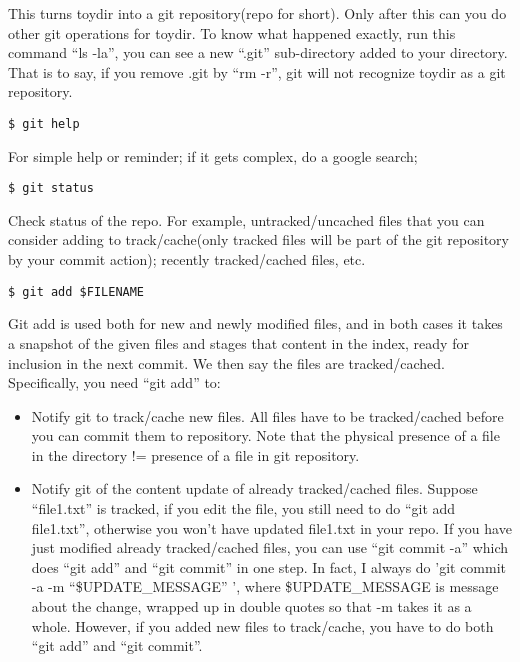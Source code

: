 \documentclass{article} %
\newcommand{\q}[1]{``#1''}
\begin{document}
This turns toydir into a git repository(repo for short). Only after this can you do other git operations for toydir. To know what happened exactly, run this command \q{ls -la}, you can see a new \q{.git} sub-directory added to your directory. That is to say, if you remove .git by \q{rm -r}, git will not recognize toydir as a git repository.

\begin{lstlisting}
$ git help
\end{lstlisting}

For simple help or reminder; if it gets complex, do a google search;

\begin{lstlisting}
$ git status
\end{lstlisting}

Check status of the repo. For example, untracked/uncached files that you can consider adding to track/cache(only tracked files will be part of the git repository by your commit action); recently tracked/cached files, etc.

\begin{lstlisting}
$ git add $FILENAME
\end{lstlisting}

Git add is used both for new and newly modified files, and in both cases it takes a snapshot of the given files and stages that content in the index, ready for inclusion in the next commit. We then say the files are tracked/cached. Specifically, you need \q{git add} to:

\begin{itemize}
	\item Notify git to track/cache new files. All files have to be tracked/cached before you can commit them to repository. Note that the physical presence of a file in the directory != presence of a file in git repository.

	\item Notify git of the content update of already tracked/cached files. Suppose \q{file1.txt} is tracked, if you edit the file, you still need to do \q{git add file1.txt}, otherwise you won't have updated file1.txt in your repo. If you have just modified already tracked/cached files, you can use \q{git commit -a} which does \q{git add} and \q{git commit} in one step. In fact, I always do 'git commit -a -m \q{\$UPDATE\_MESSAGE} ', where \$UPDATE\_MESSAGE is message about the change, wrapped up in double quotes so that -m takes it as a whole. However, if you added new files to track/cache, you have to do both \q{git add} and \q{git commit}.

\end{itemize}
\end{document}
